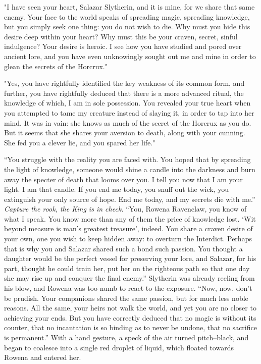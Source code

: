 "I have seen your heart, Salazar Slytherin, and it is mine, for we share that same enemy. Your face to the world speaks of spreading magic, spreading knowledge, but you simply seek one thing: you do not wish to die. Why must you hide this desire deep within your heart? Why must this be your craven, secret, sinful indulgence? Your desire is heroic. I see how you have studied and pored over ancient lore, and you have even unknowingly sought out me and mine in order to glean the secrets of the Horcrux."

"Yes, you have rightfully identified the key weakness of its common form, and further, you have rightfully deduced that there is a more advanced ritual, the knowledge of which, I am in sole possession. You revealed your true heart when you attempted to tame my creature instead of slaying it, in order to tap into her mind. It was in vain: she knows as much of the secret of the Horcrux as you do. But it seems that she shares your aversion to death, along with your cunning. She fed you a clever lie, and you spared her life."
\pagebreak

“You struggle with the reality you are faced with. You hoped that by spreading the light of knowledge, someone would shine a candle into the darkness and burn away the specter of death that looms over you. I tell you now that I am your light. I am that candle. If you end me today, you snuff out the wick, you extinguish your only source of hope. End me today, and my secrets die with me.”
\SmallVSpace
\emph{Capture the rook, the King is in check.}
\SmallVSpace
“You, Rowena Ravenclaw, you know of what I speak. You know more than any of them the price of knowledge lost. ‘Wit beyond measure is man’s greatest treasure’, indeed. You share a craven desire of your own, one you wish to keep hidden away: to overturn the Interdict. Perhaps that is why you and Salazar shared such a bond{\el} such{\el} passion. You thought a daughter would be the perfect vessel for preserving your lore, and Salazar, for his part, thought he could train her, put her on the righteous path so that one day she may rise up and conquer the final enemy.”
\SmallVSpace
Slytherin was already reeling from his blow, and Rowena was too numb to react to the exposure.
\SmallVSpace
“Now, now, don’t be prudish. Your companions shared the same passion, but for much less noble reasons. All the same, your heirs not walk the world, and yet you are no closer to achieving your ends. But you have correctly deduced that no magic is without its counter, that no incantation is so binding as to never be undone, that no sacrifice{\el} is permanent.” With a hand gesture, a speck of the air turned pitch\mbox{--}black, and began to coalesce into a single red droplet of liquid, which floated towards Rowena and entered her.
\pagebreak

